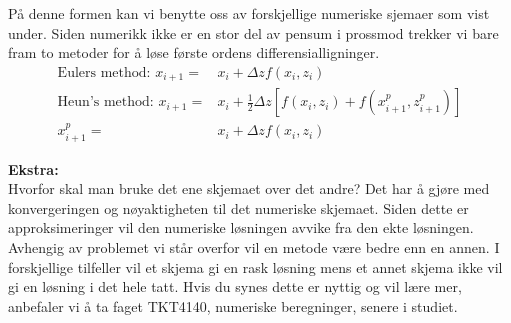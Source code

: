 På denne formen kan vi benytte oss av forskjellige numeriske sjemaer som vist under. Siden numerikk ikke er en stor del av pensum i prossmod trekker vi bare fram to metoder for å løse første ordens differensialligninger. 
\begin{align}
    \label{eq:numerical_schemes}
    \text{Eulers method: } x_{i+1} =& x_{i} + \Delta z f(x_i,z_i) \\[0.3cm]
    \text{Heun's method: }x_{i+1} =& x_i + \frac{1}{2}\Delta z[f(x_i,z_i)+f(x_{i+1}^p,z_{i+1}^p)] \\
    x_{i+1}^p =& x_{i} + \Delta z f(x_i,z_i)
\end{align}

\textbf{Ekstra:}\\
Hvorfor skal man bruke det ene skjemaet over det andre? Det har å gjøre med konvergeringen og nøyaktigheten til det numeriske skjemaet. Siden dette er approksimeringer vil den numeriske løsningen avvike fra den ekte løsningen. Avhengig av problemet vi står overfor vil en metode være bedre enn en annen. I forskjellige tilfeller vil et skjema gi en rask løsning mens et annet skjema ikke vil gi en løsning i det hele tatt. Hvis du synes dette er nyttig og vil lære mer, anbefaler vi å ta faget TKT4140, numeriske beregninger, senere i studiet.  



